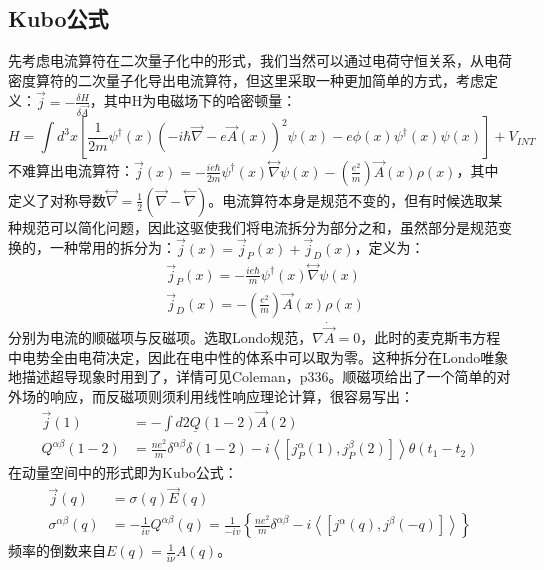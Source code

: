 \documentclass[10pt,openany]{book}
\theoremstyle{thmstyle} %
\theoremstyle{defstyle} %
\theoremstyle{prostyle} %
\begin{document}
\subsection{Kubo公式}
先考虑电流算符在二次量子化中的形式，我们当然可以通过电荷守恒关系，从电荷密度算符的二次量子化导出电流算符，但这里采取一种更加简单的方式，考虑定义：$ \vec{j}=-\frac{\delta H}{\delta \vec{A}} $，其中H为电磁场下的哈密顿量：
\begin{equation}
	H=\int d^3 x\left[\frac{1}{2 m} \psi^{\dagger}(x)(-i \hbar \vec{\nabla}-e \vec{A}(x))^2 \psi(x)-e \phi(x) \psi^{\dagger}(x) \psi(x)\right]+V_{I N T}
\end{equation} 
不难算出电流算符：$ \vec{j}(x)=-\frac{i e \hbar}{2 m} \psi^{\dagger}(x) \stackrel{\leftrightarrow}{\nabla} \psi(x)-\left(\frac{e^2}{m}\right) \vec{A}(x) \rho(x) $，其中定义了对称导数$ \stackrel{\leftrightarrow}{\nabla}=\frac{1}{2}(\stackrel{\rightarrow}{\nabla}-\stackrel{\leftarrow}{\nabla}) $。电流算符本身是规范不变的，但有时候选取某种规范可以简化问题，因此这驱使我们将电流拆分为部分之和，虽然部分是规范变换的，一种常用的拆分为：$ \vec{j}(x)=\vec{j}_P(x)+\vec{j}_D(x) $，定义为：
\begin{equation}
	\begin{aligned}
		&\vec{j}_P(x)=-\frac{i e \hbar}{m} \psi^{\dagger}(x) \stackrel{\leftrightarrow}{\nabla} \psi(x)\\
		&\vec{j}_D(x)=-\left(\frac{e^2}{m}\right) \vec{A}(x) \rho(x)
		\end{aligned}
\end{equation}   
分别为电流的顺磁项与反磁项。选取Londo规范，$ \nabla \dot \vec{A}=0 $，此时的麦克斯韦方程中电势全由电荷决定，因此在电中性的体系中可以取为零。这种拆分在Londo唯象地描述超导现象时用到了，详情可见Coleman，p336。顺磁项给出了一个简单的对外场的响应，而反磁项则须利用线性响应理论计算，很容易写出：
\begin{equation}
	\begin{aligned}
		\vec{j}(1) & =-\int d 2 \underline{Q}(1-2) \vec{A}(2) \\
		Q^{\alpha \beta}(1-2) & =\frac{n e^2}{m} \delta^{\alpha \beta} \delta(1-2)-i\left\langle\left[j_P^\alpha(1), j_P^\beta(2)\right]\right\rangle \theta\left(t_1-t_2\right)
		\end{aligned}
\end{equation}
在动量空间中的形式即为Kubo公式：
\begin{equation}
	\begin{aligned}
		\vec{j}(q) & =\sigma(q) \vec{E}(q) \\
		\sigma^{\alpha \beta}(q) & =-\frac{1}{i v} Q^{\alpha \beta}(q)=\frac{1}{-i v}\left\{\frac{n e^2}{m} \delta^{\alpha \beta}-i\left\langle\left[j^\alpha(q), j^\beta(-q)\right]\right\rangle\right\}
		\end{aligned}
\end{equation}
频率的倒数来自$ E(q)=\frac{1}{i\nu}A(q) $。\\
\end{document}
